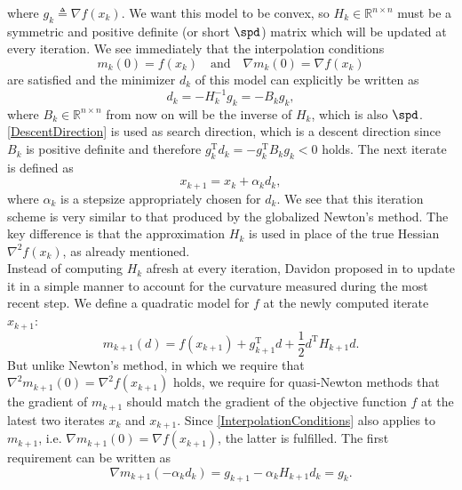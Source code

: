 where $g_k \triangleq \nabla f(x_k)$. We want this model to be convex, so $H_k \in \mathbb{R}^{n \times n}$ must be a symmetric and positive definite (or short $\spd$) matrix which will be updated at every iteration. We see immediately that the interpolation conditions 
\begin{equation}\label{InterpolationConditions}
    m_{k}(0) = f(x_k) \quad \text{and} \quad \nabla m_{k}(0) = \nabla f(x_k)
\end{equation}
are satisfied and the minimizer $d_k$ of this model can explicitly be written as
\begin{equation}\label{DescentDirection}
    d_k = -H^{-1}_k g_k = -B_k g_k,
\end{equation}
where $B_k \in \mathbb{R}^{n \times n}$ from now on will be the inverse of $H_k$, which is also $\spd$. \cref{DescentDirection} is used as search direction, which is a descent direction since $B_k$ is positive definite and therefore $g^{\mathrm{T}}_k d_k = - g^{\mathrm{T}}_k B_k g_k < 0$ holds. The next iterate is defined as 
\begin{equation*}
    x_{k+1} = x_k + \alpha_k d_k,
\end{equation*}
where $\alpha_k$ is a stepsize appropriately chosen for $d_k$. We see that this iteration scheme is very similar to that produced by the globalized Newton's method. The key difference is that the approximation $H_k$ is used in place of the true Hessian $\nabla^2 f(x_k)$, as already mentioned. \\
Instead of computing $H_k$ afresh at every iteration, Davidon proposed in \cite{Davidon:1959} to update it in a simple manner to account for the curvature measured during the most recent step. We define a quadratic model for $f$ at the newly computed iterate $x_{k+1}$: 
\begin{equation*}
    m_{k+1}(d) = f(x_{k+1}) + g^{\mathrm{T}}_{k+1} d + \frac{1}{2} d^{\mathrm{T}} H_{k+1} d.
\end{equation*}
But unlike Newton's method, in which we require that $\nabla^2 m_{k+1}(0) = \nabla^2 f(x_{k+1})$ holds, we require for quasi-Newton methods that the gradient of $m_{k+1}$ should match the gradient of the objective function $f$ at the latest two iterates $x_k$ and $x_{k+1}$. Since \cref{InterpolationConditions} also applies to $m_{k+1}$, i.e. $\nabla m_{k+1}(0) = \nabla f(x_{k+1})$, the latter is fulfilled. The first requirement can be written as
\begin{equation*}
    \nabla m_{k+1}(- \alpha_k d_k) = g_{k+1} - \alpha_k H_{k+1} d_k = g_k.
\end{equation*}
